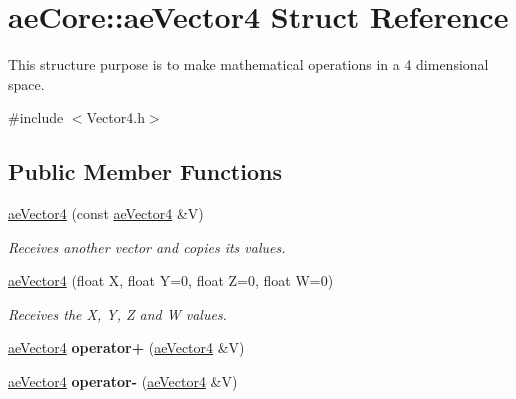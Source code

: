 \hypertarget{structae_core_1_1ae_vector4}{}\section{ae\+Core\+:\+:ae\+Vector4 Struct Reference}
\label{structae_core_1_1ae_vector4}


This structure purpose is to make mathematical operations in a 4 dimensional space.  




{\ttfamily \#include $<$Vector4.\+h$>$}

\subsection*{Public Member Functions}
\begin{DoxyCompactItemize}
\item 
\hyperlink{structae_core_1_1ae_vector4_a9a5559318c89c185461ad4447a5f4353}{ae\+Vector4} (const \hyperlink{structae_core_1_1ae_vector4}{ae\+Vector4} \&V)\hypertarget{structae_core_1_1ae_vector4_a9a5559318c89c185461ad4447a5f4353}{}\label{structae_core_1_1ae_vector4_a9a5559318c89c185461ad4447a5f4353}

\begin{DoxyCompactList}\small\item\em Receives another vector and copies its values. \end{DoxyCompactList}\item 
\hyperlink{structae_core_1_1ae_vector4_a51632dbe5814fd185b24bae86c343182}{ae\+Vector4} (float X, float Y=0, float Z=0, float W=0)\hypertarget{structae_core_1_1ae_vector4_a51632dbe5814fd185b24bae86c343182}{}\label{structae_core_1_1ae_vector4_a51632dbe5814fd185b24bae86c343182}

\begin{DoxyCompactList}\small\item\em Receives the X, Y, Z and W values. \end{DoxyCompactList}\item 
\hyperlink{structae_core_1_1ae_vector4}{ae\+Vector4} {\bfseries operator+} (\hyperlink{structae_core_1_1ae_vector4}{ae\+Vector4} \&V)\hypertarget{structae_core_1_1ae_vector4_aa815ba8e0cb3348bda89158ea5991c99}{}\label{structae_core_1_1ae_vector4_aa815ba8e0cb3348bda89158ea5991c99}

\item 
\hyperlink{structae_core_1_1ae_vector4}{ae\+Vector4} {\bfseries operator-\/} (\hyperlink{structae_core_1_1ae_vector4}{ae\+Vector4} \&V)\hypertarget{structae_core_1_1ae_vector4_a1b2e386f5719121750b347e568484591}{}\label{structae_core_1_1ae_vector4_a1b2e386f5719121750b347e568484591}


\end{DoxyCompactItemize}

